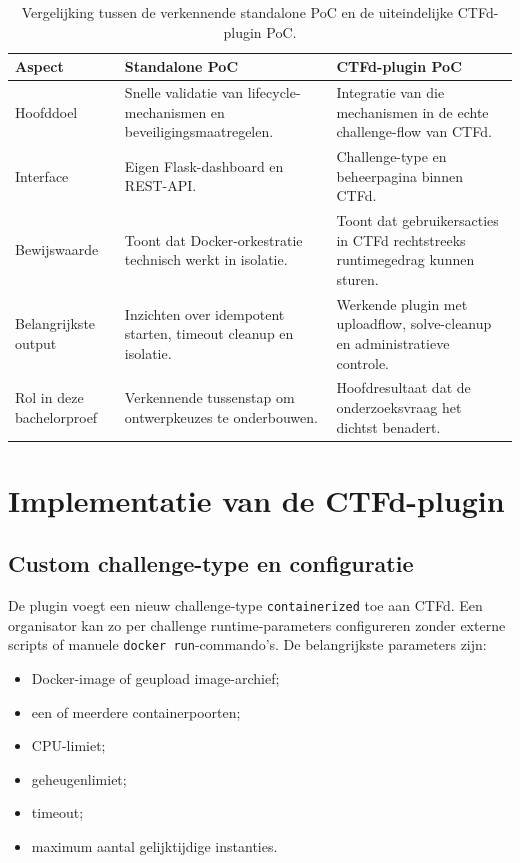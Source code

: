 \begin{table}[htbp]
  \centering
  \caption[Vergelijking van beide PoC's]{Vergelijking tussen de verkennende standalone PoC en de uiteindelijke CTFd-plugin PoC.}
  \label{tab:poc-vergelijking}
  \begin{tabularx}{\textwidth}{@{}lXX@{}}
    \toprule
    \textbf{Aspect} & \textbf{Standalone PoC} & \textbf{CTFd-plugin PoC} \\
    \midrule
    Hoofddoel & Snelle validatie van lifecycle-mechanismen en beveiligingsmaatregelen. & Integratie van die mechanismen in de echte challenge-flow van CTFd. \\
    Interface & Eigen Flask-dashboard en REST-API. & Challenge-type en beheerpagina binnen CTFd. \\
    Bewijswaarde & Toont dat Docker-orkestratie technisch werkt in isolatie. & Toont dat gebruikersacties in CTFd rechtstreeks runtimegedrag kunnen sturen. \\
    Belangrijkste output & Inzichten over idempotent starten, timeout cleanup en isolatie. & Werkende plugin met uploadflow, solve-cleanup en administratieve controle. \\
    Rol in deze bachelorproef & Verkennende tussenstap om ontwerpkeuzes te onderbouwen. & Hoofdresultaat dat de onderzoeksvraag het dichtst benadert. \\
    \bottomrule
  \end{tabularx}
\end{table}

\section{Implementatie van de CTFd-plugin}%
\label{sec:poc-plugin}

\subsection{Custom challenge-type en configuratie}

De plugin voegt een nieuw challenge-type \texttt{containerized} toe aan CTFd. Een organisator kan zo per challenge runtime-parameters configureren zonder externe scripts of manuele \texttt{docker run}-commando's. De belangrijkste parameters zijn:

\begin{itemize}
  \item Docker-image of geupload image-archief;
  \item een of meerdere containerpoorten;
  \item CPU-limiet;
  \item geheugenlimiet;
  \item timeout;
  \item maximum aantal gelijktijdige instanties.
\end{itemize}

